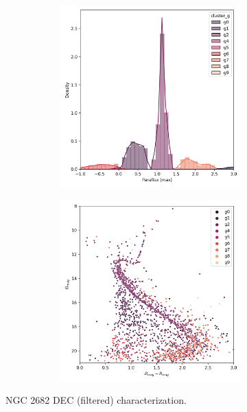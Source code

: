 \documentclass[11pt, a4paper, english]{book}
\begin{document}
\begin{figure}[H]
\begin{subfigure}{0.9\textwidth}
\begin{subfigure}[t]{0.30\textwidth}
    \end{subfigure}
    \hfill
    \begin{subfigure}[t]{0.30\textwidth}
      \centering
      \includegraphics[width=\textwidth]{../figures/ngc_2682/dec_parallax_filtered_ngc_2682.png}
    \end{subfigure}
    \hfill
    \begin{subfigure}[t]{0.30\textwidth}
      \centering
      \includegraphics[width=\textwidth]{../figures/ngc_2682/dec_hr_diagram_filtered_ngc_2682.png}
    \end{subfigure}
  \end{subfigure}
  \caption{NGC 2682 DEC (filtered) characterization.}
\end{figure}
\end{document}
